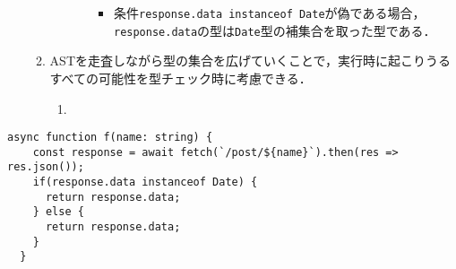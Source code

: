 \begin{enumerate}
\begin{enumerate}
\begin{enumerate}
\begin{itemize}
\begin{itemize}
                                            \item 条件\texttt{response.data instanceof Date}が偽である場合，\texttt{response.data}の型は\texttt{Date}型の補集合を取った型である．
                                        \end{itemize}
                              \end{itemize}
                    \end{enumerate}
              \item ASTを走査しながら型の集合を広げていくことで，実行時に起こりうるすべての可能性を型チェック時に考慮できる．
                    \begin{enumerate}
                        \item
                    \end{enumerate}
          \end{enumerate}
\end{enumerate}

\begin{lstlisting}[caption=例, label=lst:example]
  async function f(name: string) {
    const response = await fetch(`/post/${name}`).then(res => res.json());
    if(response.data instanceof Date) {
      return response.data;
    } else {
      return response.data;
    }
  }
\end{lstlisting}
